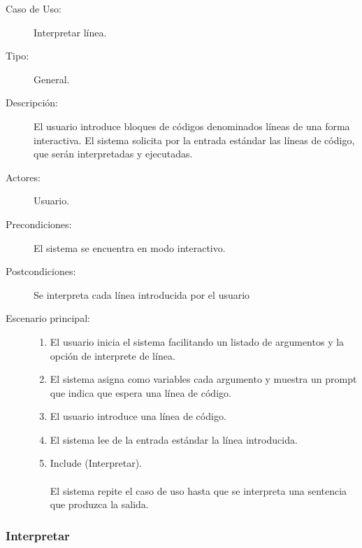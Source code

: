 \begin{description}
   \item[Caso de Uso:]  Interpretar línea.
   \item[Tipo:] General.
   \item[Descripción:] 
   El usuario introduce bloques de códigos denominados líneas
   de una forma interactiva. El sistema solicita por la entrada 
   estándar las líneas de código, que serán interpretadas y ejecutadas.
   \item[Actores:] 
   Usuario.
   \item[Precondiciones:] 
   El sistema se encuentra en modo interactivo.
   \item[Postcondiciones:] 
   Se interpreta cada línea introducida por el usuario
   \item[Escenario principal:] \hfill
   \begin{enumerate}
   \item El usuario inicia el sistema facilitando un listado de argumentos y la opción de interprete de línea.
   \item El sistema asigna como variables cada argumento y muestra un prompt que indica que espera una línea de código.
   \item El usuario introduce una línea de código.
   \item El sistema lee de la entrada estándar la línea introducida.
   \item Include (Interpretar). \\\\\hfill\hfill
   El sistema repite el caso de uso hasta que se interpreta una sentencia que produzca 
   la salida.
   \end{enumerate}
\end{description}

\subsubsection{Interpretar}

